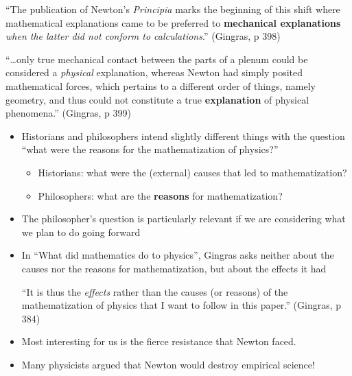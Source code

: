 \documentclass[fleqn]{beamer}
\newcommand{\kw}[1]{\textbf{#1}}
\begin{document}
\begin{frame}

  ``The publication of Newton's \emph{Principia} marks the beginning
  of this shift where mathematical explanations came to be preferred
  to \kw{mechanical explanations} \emph{when the latter did not
    conform to calculations}.'' (Gingras, p 398)

\end{frame}


\begin{frame}

  ``\dots only true mechanical contact between the parts of a plenum
  could be considered a \emph{physical} explanation, whereas Newton
  had simply posited mathematical forces, which pertains to a
  different order of things, namely geometry, and thus could not
  constitute a true \kw{explanation} of physical phenomena.''
  (Gingras, p 399)


\end{frame}


\begin{frame}

  \begin{itemize}
  \item Historians and philosophers intend slightly different things
    with the question ``what were the reasons for the mathematization
    of physics?''
    \begin{itemize}
    \item Historians: what were the (external) causes that led to
      mathematization?
    \item Philosophers: what are the \textbf{reasons} for
      mathematization?
    \end{itemize}
  \item The philosopher's question is particularly relevant if we are
    considering what we plan to do going forward
  \end{itemize}


\end{frame}

\begin{frame}

  \begin{itemize}
  \item In ``What did mathematics do to physics'', Gingras asks
    neither about the causes nor the reasons for mathematization, but
    about the effects it had

    ``It is thus the \emph{effects} rather than the causes (or
    reasons) of the mathematization of physics that I want to follow
    in this paper.'' (Gingras, p 384)
    
  \item Most interesting for us is the fierce resistance that Newton
    faced.

  \item Many physicists argued that Newton would destroy empirical
    science! 
  \end{itemize}

\end{frame}
\end{document}
